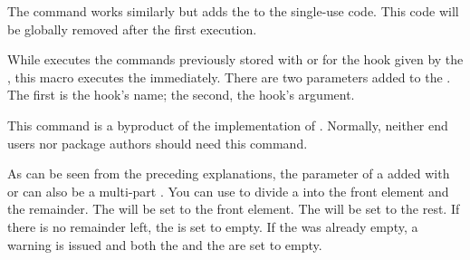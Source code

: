 The  command works similarly but adds the
 to the single-use code. This code will be globally removed
after the first execution.%
\EndIndexGroup

\begin{Declaration}
\end{Declaration}
While
 executes the commands previously stored
with  or
 for the hook given by the
, this macro executes the  immediately. There
are two parameters added to the . The first is the hook's name;
the second, the hook's argument.

This command is a byproduct of the implementation of 
. Normally, neither end users nor package
authors should need this command.%
\EndIndexGroup

\begin{Declaration}
\end{Declaration}
As can be seen from the preceding
explanations, the parameter of a  added with
 or
 can also be a multi-part
. You can use  to divide a
 into the front element and the remainder. The
 will be set to the front element. The  will be set to the rest. If there is no remainder left, the
 is set to empty. If the  was already
empty, a warning is issued and both the  and the
 are set to empty.

